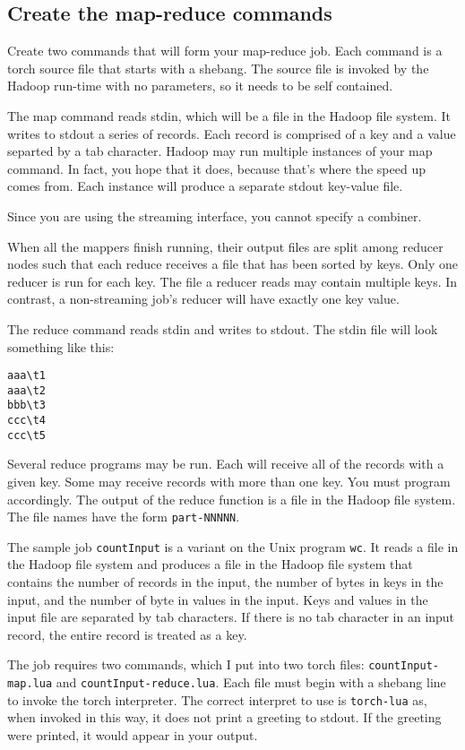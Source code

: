 \documentclass{article}
\let\code\texttt %
\begin{document}
\subsection{Create the map-reduce commands}

Create two commands that will form your map-reduce job. Each command is
a torch source file that starts with a shebang. The source file is
invoked by the Hadoop run-time with no parameters, so it needs to be
self contained.

The map command reads stdin, which will be a file in the Hadoop file
system. It writes to stdout a series of records. Each record is
comprised of a key and a value separted by a tab character. Hadoop 
may run multiple instances of your map command. In fact, you hope that
it does, because that's where the speed up comes from. Each instance 
will produce a separate stdout key-value file.

Since you are using the streaming interface, you cannot specify a
combiner. 

When all the mappers finish running, their output files are split among
reducer nodes such that each reduce receives a file that has been sorted
by keys. Only one reducer is run for each key. The file a reducer reads
may contain multiple keys. In contrast, a non-streaming job's reducer
will have exactly one key value.

The reduce command reads stdin and writes to stdout. The stdin file
will look something like this:

\begin{verbatim}
aaa\t1
aaa\t2
bbb\t3
ccc\t4
ccc\t5
\end{verbatim}

Several reduce programs may be run. Each will receive all of the records
with a given key. Some may receive records with more than one key. You
must program accordingly. The output of the reduce function is a file in
the Hadoop file system. The file names have the form \code{part-NNNNN}.

The sample job \code{countInput} is a variant on the Unix program
\code{wc}. It reads a file in the Hadoop file system and produces a file
in the Hadoop file system that contains the number of records in the
input, the number of bytes in keys in the input, and the number of byte
in values in the input. Keys and values in the input file are separated
by tab characters. If there is no tab character in an input record, the
entire record is treated as a key.

The job requires two commands, which I put into two torch files:
\code{countInput-map.lua} and \code{countInput-reduce.lua}. Each file
must begin with a shebang line to invoke the torch interpreter. The
correct interpret to use is \code{torch-lua} as, when invoked in this
way, it does not print a greeting to stdout. If the greeting were
printed, it would appear in your output.
\end{document}
